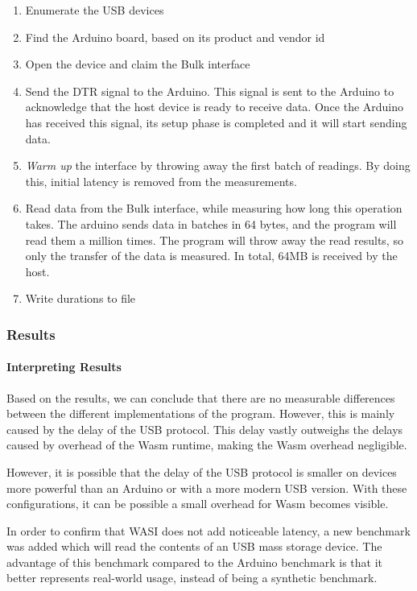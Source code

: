 \begin{enumerate}
\item Enumerate the USB devices
\item Find the Arduino board, based on its product and vendor id
\item Open the device and claim the Bulk interface
\item Send the \acrfull{DTR} signal to the Arduino. This signal is sent to the Arduino to acknowledge that the host device is ready to receive data. Once the Arduino has received this signal, its setup phase is completed and it will start sending data.
\item \textit{Warm up } the interface by throwing away the first batch of readings. By doing this, initial latency is removed from the measurements.
\item Read data from the Bulk interface, while measuring how long this operation takes. The arduino sends data in batches in 64 bytes, and the program will read them a million times. The program will throw away the read results, so only the transfer of the data is measured. In total, 64MB is received by the host.
\item Write durations to file
\end{enumerate}

\subsubsection{Results}

\paragraph{Interpreting Results}
Based on the results, we can conclude that there are no measurable differences between the different implementations of the program. However, this is mainly caused by the delay of the USB protocol. This delay vastly outweighs the delays caused by overhead of the Wasm runtime, making the Wasm overhead negligible.

However, it is possible that the delay of the USB protocol is smaller on devices more powerful than an Arduino or with a more modern USB version. With these configurations, it can be possible a small overhead for Wasm becomes visible.

In order to confirm that WASI does not add noticeable latency, a new benchmark was added which will read the contents of an USB mass storage device. The advantage of this benchmark compared to the Arduino benchmark is that it better represents real-world usage, instead of being a synthetic benchmark.

